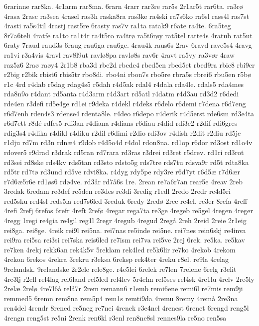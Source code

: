 {6rarinne
rar8ka.
4r1arm
rar8ma.
6rarn
4rarr
rar3re
rar5s
2r1ar5t
rar6ta.
ra3rø
4rasa
2rasc
ra3sea
4rasel
ras3h
raska8ra
ras3ke
ra4ski
ra7s6ko
ra6sl
rass4l
ras7st
4rasti
ra5s4til
4rastj
rast5re
6rasty
ras7v
ra1ta
ratak9
r6ate
ra4te.
6ra5teg
8r7a6teli
4ratfe
ra1to
ra1t4r
ra4t5ro
ra4trø
ra5t6røy
rat5tel
ratte4s
4ratub
rat5ut
6raty
7raud
raud3s
6raug
rau6ga
rau6ge.
4rau4k
raus6s
2rav
6ravd
rave5s4
4ravg
ra1vi
r3a4vis
4ravl
rav8l9ut
ravlø8pa
ravlø8s
rav6r
4ravt
ra5vy
ra3vør
4raw
raz5z6
2raø
raøy4
2r1b8
rba3d
rbe2d
rbede4
rbed5en
rbed5et
rbed9ra
rbie8
rbi9er
r2big
r2bik
rbist6
rbis5tr
rbo8di.
rbo4ni
rbon7s
rbo5re
rbra5s
rbrei6
rbu5en
r5bø
r1c
4rd
r4dab
r5dag
rdag4s5
r5dah
r4d5ak
rdal4
r4dala
rda4le.
rdals5
rda4mes
rda8n9o
r4dant
rd5anta
r4d3arm
r4d3art
rd5atl
r4datm
r4d3au
rd3d2
r6dedi
rde4en
r3defi
rd5e4ge
rd1ei
r9deka
r4dekl
r4deks
r6delo
r6demi
r7dena
r6d7eng
r6d7enh
rden4s3
rdense4
rdenta8le.
r4deo
r6depo
r4derik
r4d5erst
rde6sm
rd3e4ta
r6d7ett
r8dé
rdfes5
rdi3an
r4diana
r4dians
r6diau
r4did
rdi3e2
r2dif
rdi6gres
rdig3s4
r4dika
r4dikl
r4diku
r2dil
r6dimi
r2dio
rdi3ov
r4dish
r2dit
r2diu
rd5je
r1dju
rd7m
rd3n
rdnæ4
r9dob
r4d5o4d
r4dol
rdon8na.
rd1op
r6dor
rd3ost
rd1o4v
rdover5
r9drad
r3drak
rd5ran
rd7rara
rd3ras
r3drei
rd3ret
r5drev.
rd1ri
rd3rot
rd3sei
rd8ske
rds4kv
rds5tan
rd3sto
rdsto5g
rds7tre
rds7tu
rdsva9r
rd5t
rdta8ka
rd5tr
rd7tø
rd3und
rd5ve
rdvi8ka.
r4dyg
rdy5pe
rdy3re
r6d7yt
r6d5æ
r7d6ær
r7d6æ5r6e
rd1øs6
rdø4ve.
rd3år
rd7å6s
1re.
2rean
re7a6r7an
rear5e
4reav
2reb
3redak
6redam
re3def
re5den
re3des
re3di
3redig
r1edl
2redo
2redr
re4d5ri
red5sku
red4sl
reds5la
red7s6led
3reduk
6redy
2redø
2ree
re4el.
re3er
8refa
4reff
4refi
2refj
6refos
6refr
4reft
2refø
4regar
rega7ta
re3ge
4regeb
re5gel
4regen
4reger
4regg
1regi
re4gia
re4gil
reg1l
2regr
4regub
4regud
2regå
2reh
2reid
2reie
2r1eig
rei8ga.
rei8ge.
4reik
rei9l
rei5na.
rei7nas
re5inde
rei5ne.
rei7nes
rein6skj
re4inva
rei9ra
rei5sa
rei3si
rei7ska
reis6led
re7ism
rei7va
rei5ve
2rej
6rek.
re5ka.
re5kav
re7ken
4rekj
rekk6an
rek4k5v
5reklam
rek4led
re5k6lir
re7ko
4rekob
4rekom
4rekon
6rekos
4rekra
3rekru
r3eksa
6reksp
rek4ter
4reku
r8el.
re9la
4relag
9relandsk.
9relandske
2r2ele
rele8ge.
r4e5lei
6relek
re7len
7relene
6relg
r3elit
4re3lj
r2ell
rel4lag
rel6land
rel5led
rel4lev
5r4elm
rel5ses
rel4sk
4re1lu
4relv
2re5ly
2relæ
2relø
4re7l6å
relå7r
2rem
remann6
r1emb
remi6ene
remi6l
re7mis
rem9ji
remmed5
6remn
rem8na
rem5p4
rem1s
remti9da
4remu
8remy
4remå
2re3na
ren4del
4rendr
8rened
re5neg
re7nei
4renek
r3e4nel
4renest
6renet
6rengd
reng5l
4rengn
reng5st
re5ni
2renk
ren6kl
r3enl
ren8ne8sl
rennes9la
re5no
ren5sa
}
